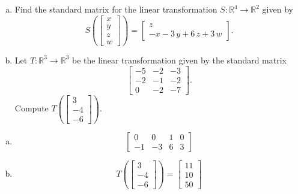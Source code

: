 
\begin{exerciseStatement}

\begin{enumerate}[(a)]
\item Find the standard matrix for the linear transformation \(S:\mathbb{R}^ 4  \to \mathbb{R}^ 2 \) given by \[S\left(  \left[\begin{array}{c}
x \\
y \\
z \\
{w}
\end{array}\right]  \right) =  \left[\begin{array}{c}
z \\
-x - 3 \, y + 6 \, z + 3 \, {w}
\end{array}\right] .\]
\item Let \(T:\mathbb{R}^ 3  \to \mathbb{R}^ 3 \) be the linear transformation given by the standard matrix \[ \left[\begin{array}{ccc}
-5 & -2 & -3 \\
-2 & -1 & -2 \\
0 & -2 & -7
\end{array}\right] .\] Compute \(T\left( \left[\begin{array}{c}
3 \\
-4 \\
-6
\end{array}\right]  \right)\). 
\end{enumerate}
    
\end{exerciseStatement}
    
\begin{exerciseAnswer} 

\begin{enumerate}[(a)]
\item \[ \left[\begin{array}{cccc}
0 & 0 & 1 & 0 \\
-1 & -3 & 6 & 3
\end{array}\right] \]
\item \[T\left( \left[\begin{array}{c}
3 \\
-4 \\
-6
\end{array}\right]  \right)= \left[\begin{array}{c}
11 \\
10 \\
50
\end{array}\right] \]
\end{enumerate}
    
\end{exerciseAnswer}
    

